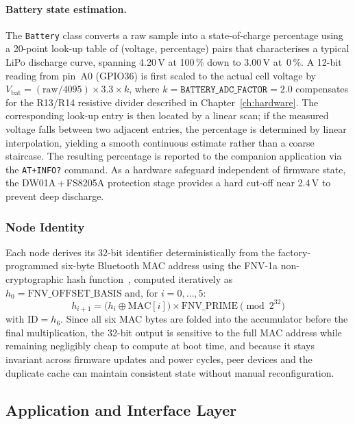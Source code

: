 \documentclass[english,bachelor]{tfgitic}[2026/01/22]
\begin{document}
\paragraph{Battery state estimation.}
The \texttt{Battery} class converts a raw  sample into a state-of-charge
percentage using a 20-point look-up table of (voltage, percentage) pairs that
characterises a typical LiPo discharge curve, spanning 4.20\,V at 100\,\% down to
3.00\,V at~0\,\%. A 12-bit  reading from pin~A0 (GPIO36) is first scaled
to the actual cell voltage by $V_{\mathrm{bat}} = (\mathrm{raw}/4095) \times 3.3
\times k$, where $k = \texttt{BATTERY\_ADC\_FACTOR} = 2.0$ compensates for the
R13/R14 resistive divider described in Chapter~\ref{ch:hardware}. The corresponding
look-up entry is then located by a linear scan; if the measured voltage falls between
two adjacent entries, the percentage is determined by linear interpolation, yielding a
smooth continuous estimate rather than a coarse staircase. The resulting percentage is
reported to the companion application via the \texttt{AT+INFO?} command. As a
hardware safeguard independent of firmware state, the DW01A\,+\,FS8205A protection
stage provides a hard cut-off near 2.4\,V to prevent deep discharge.

\subsubsection{Node Identity}
\label{sec:fw_identity}

Each node derives its 32-bit identifier deterministically from the factory-programmed
six-byte Bluetooth MAC address using the FNV-1a non-cryptographic hash
function~\cite{eastlake2011fnv}, computed iteratively as
$h_0 = \mathrm{FNV\_OFFSET\_BASIS}$ and, for $i = 0, \ldots, 5$:
\[
    h_{i+1} = \bigl(h_i \oplus \mathrm{MAC}[i]\bigr) \times \mathrm{FNV\_PRIME}
    \pmod{2^{32}}
\]
with $\mathrm{ID} = h_6$. Since all six MAC bytes are folded into the accumulator
before the final multiplication, the 32-bit output is sensitive to the full MAC
address while remaining negligibly cheap to compute at boot time, and because it
stays invariant across firmware updates and power cycles, peer devices and the
duplicate cache can maintain consistent state without manual reconfiguration.


\subsection{Application and Interface Layer}
\label{sec:fw_application}
\end{document}
